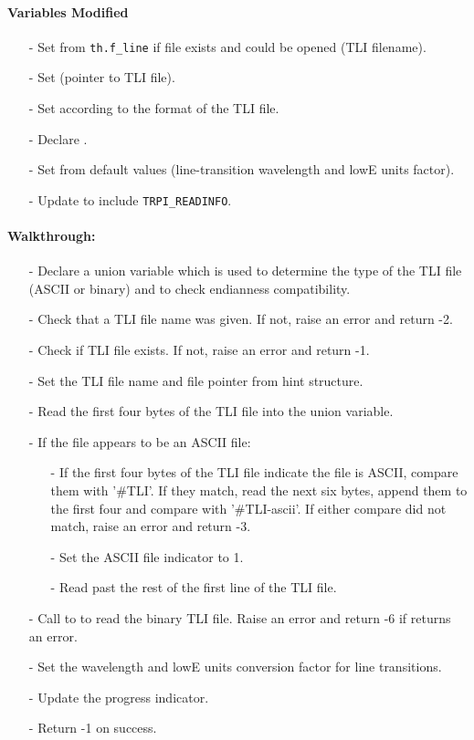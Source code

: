 \documentclass[letterpaper,12pt]{article}
\begin{document}
\paragraph{Variables Modified}
\begin{enumerate}[leftmargin=10pt, noitemsep, parsep=0pt, topsep=0ex]
\item[-] Set  from {\tt th.f\_line} if file
  exists and could be opened (TLI filename).
\item[-] Set  (pointer to TLI file).
\item[-] Set  according to the format of the TLI file.
\item[-] Declare .
\item[-] Set  from
  default values (line-transition wavelength and lowE units factor).
\item[-] Update  to include {\tt TRPI\_READINFO}.
\end{enumerate}

\paragraph{Walkthrough:}
\begin{enumerate}[leftmargin=10pt, noitemsep, parsep=0pt, topsep=0ex]
\item[-] Declare a union variable which is used to determine the type of the TLI file (ASCII or binary) and to check endianness compatibility.
\item[-] Check that a TLI file name was given. If not, raise an error and return -2.
\item[-] Check if TLI file exists. If not, raise an error and return -1.
\item[-] Set the TLI file name and file pointer from hint structure.
\item[-] Read the first four bytes of the TLI file into the union variable.
\item[-] If the file appears to be an ASCII file:
\begin{enumerate}[leftmargin=10pt, noitemsep, parsep=0pt, topsep=0ex]
\item[-] If the first four bytes of the TLI file indicate the file is ASCII, compare them with '#TLI'. If they match, read the next six bytes, append them to the first four and compare with '#TLI-ascii'. If either compare did not match, raise an error and return -3. 
\item[-] Set the ASCII file indicator to 1.
\item[-] Read past the rest of the first line of the TLI file.
\end{enumerate}
\item[-] Call to  to read the binary TLI file. Raise an error and return -6 if  returns an error.
\item[-] Set the wavelength and lowE units conversion factor for line transitions.
\item[-] Update the progress indicator.
\item[-] Return -1 on success.
\end{enumerate}
\end{document}
